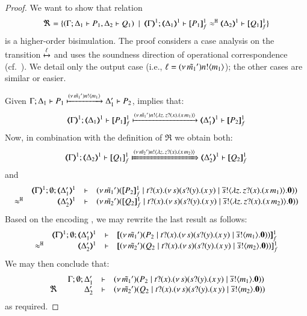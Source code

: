\begin{proof}

	\noi We want to show that relation
%
	\[
		\Re = \set{(\horel{\Gamma}{\Delta_1}{P_1}{,}{\Delta_2}{Q_1}) \setbar \horel{\mapt{\Gamma}^{1}}{\mapt{\Delta_1}^{1}}{\pmapp{P_1}{1}{f}}{\hwb}{\mapt{\Delta_2}^{1}}{\pmapp{Q_1}{1}{f}}}
	\]
	is a higher-order bisimulation.
%
	\noi	The proof considers a case analysis on the transition $\xmapsto{\ell}$ and
		uses the soundness direction of operational correspondence (cf.~).
		We detail only the  output case (i.e., $\ell = (\nu\, \tilde{m_1}') n ! \langle m_1 \rangle$); the other cases are similar or easier.

\bigskip

	\noi Given $\Gamma; \Delta_1 \vdash P_1 \xmapsto{(\nu\, \tilde{m_1}') n !\langle m_1 \rangle} \Delta_1' \vdash P_2$,  implies that:
%
	\[
		\horel{\mapt{\Gamma}^{1}}{\mapt{\Delta_1}^{1}}{\pmapp{P_1}{1}{f}}{\hby{\news{\tilde{m_1}'} \bactout{n}{\abs{z}{\binp{z}{x} (\appl{x}{m_1})}}}}{\mapt{\Delta_1'}^{1}}{\pmapp{P_2}{1}{f}}
	\]
%
	\noi Now, in combination with the definition of $\Re$ we obtain both:
%
	\begin{equation*}
		\horel{\mapt{\Gamma}^{1}}{\mapt{\Delta_2}^{1}}{\pmapp{Q_1}{1}{f}}{\Hby{\news{\tilde{m_2}'} \bactout{n}{\abs{z}{\binp{z}{x} (\appl{x}{m_2})}}}}{\mapt{\Delta_2'}^{1}}{\pmapp{Q_2}{1}{f}}
		\label{prop:HOp_to_HO:full_abs11}
	\end{equation*}
%
	\noi and
%
	\[
		\mhorel	{\mapt{\Gamma}^{1}}
			{\mapt{\Delta_1'}^{1}}
			{\newsp{\tilde{m_1}'}{\pmapp{P_2}{1}{f}  \Par \hotrigger{t}{x}{s}{\abs{z}{\binp{z}{x} (\appl{x}{m_1})}} }}
			{\hwb}
			{\mapt{\Delta_2'}^{1}}
			{}
			{\newsp{\tilde{m_2}'}{\pmapp{Q_2}{1}{f} \Par \hotrigger{t}{x}{s}{\abs{z}{\binp{z}{x} (\appl{x}{m_2})}}}}
	\]
	\noi Based on the encoding , we may rewrite the last result as follows:
	\[
		\mhorel{\mapt{\Gamma}^{1}}{\mapt{\Delta_1'}^{1}}{\pmapp{\newsp{\tilde{m_1}'}{P_2 
			\Par \hotrigger{t}{x}{s}{m_1}}}{1}{f}}
		{\hwb}{\mapt{\Delta_2'}^{1}}{}{\pmapp{\newsp{\tilde{m_2}'}{Q_2 \Par \hotrigger{t}{x}{s}{m_2}}}{1}{f}}
	\]
%
	\noi We may then conclude that:
$$
		\mhorel{\Gamma}{\Delta_1'}{\newsp{\tilde{m_1}'}{P_2 \Par \hotrigger{t}{x}{s}{m_1}}}
		{\ \Re\ }{\Delta_2'}{}{\newsp{\tilde{m_2}'}{Q_2 \Par \hotrigger{t}{x}{s}{m_2}}}
$$
 as required.

\bigskip



\end{proof}
